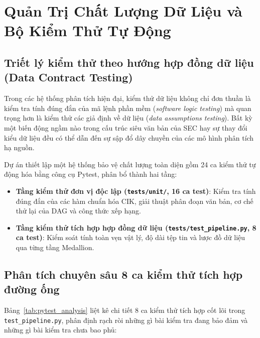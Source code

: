 \section{Quản Trị Chất Lượng Dữ Liệu và Bộ Kiểm Thử Tự Động}

\subsection{Triết lý kiểm thử theo hướng hợp đồng dữ liệu (Data Contract Testing)}
Trong các hệ thống phân tích hiện đại, kiểm thử dữ liệu không chỉ đơn thuần là kiểm tra tính đúng đắn của mã lệnh phần mềm (\textit{software logic testing}) mà quan trọng hơn là kiểm thử các giả định về dữ liệu (\textit{data assumptions testing}). Bất kỳ một biến động ngầm nào trong cấu trúc siêu văn bản của SEC hay sự thay đổi kiểu dữ liệu đều có thể dẫn đến sự sập đổ dây chuyền của các mô hình phân tích hạ nguồn.

Dự án thiết lập một hệ thống bảo vệ chất lượng toàn diện gồm 24 ca kiểm thử tự động hóa bằng công cụ Pytest, phân bổ thành hai tầng:
\begin{itemize}
    \item \textbf{Tầng kiểm thử đơn vị độc lập (\texttt{tests/unit/}, 16 ca test)}: Kiểm tra tính đúng đắn của các hàm chuẩn hóa CIK, giải thuật phân đoạn văn bản, cơ chế thử lại của DAG và công thức xếp hạng.
    \item \textbf{Tầng kiểm thử tích hợp hợp đồng dữ liệu (\texttt{tests/test\_pipeline.py}, 8 ca test)}: Kiểm soát tính toàn vẹn vật lý, độ dài tệp tin và lược đồ dữ liệu qua từng tầng Medallion.
\end{itemize}

\subsection{Phân tích chuyên sâu 8 ca kiểm thử tích hợp đường ống}
Bảng~\ref{tab:pytest_analysis} liệt kê chi tiết 8 ca kiểm thử tích hợp cốt lõi trong \texttt{test\_pipeline.py}, phân định rạch ròi những gì bài kiểm tra đang bảo đảm và những gì bài kiểm tra chưa bao phủ:

